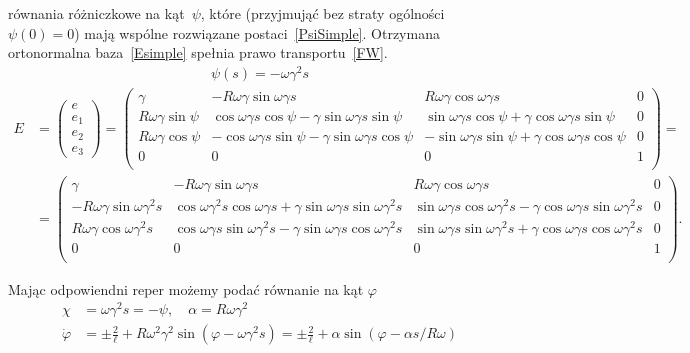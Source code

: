 równania  różniczkowe na kąt~$\psi$, które 
(przyjmująć bez straty ogólności
$\psi(0)=0$) mają wspólne rozwiązane postaci~\eqref{PsiSimple}.
Otrzymana ortonormalna baza~\eqref{Esimple} spełnia 
prawo transportu~\eqref{FW}.
\begin{align}\label{PsiSimple}
\psi (s) = -\omega \gamma^2 s
\end{align}
\begin{align}\label{Esimple}
E&=
\begin{pmatrix}
e\\
e_1\\
e_2\\
e_3
\end{pmatrix}
=
\begin{pmatrix}
\gamma  & -R\omega\gamma \sin \omega \gamma s 
& R\omega\gamma \cos\omega\gamma s         & 0 \\
R\omega\gamma \sin \psi  
&  \cos\omega\gamma s \cos\psi 
-\gamma \sin \omega\gamma s \sin\psi &  
\sin\omega\gamma s \cos\psi
+\gamma \cos\omega\gamma s\sin \psi & 0 \\
R\omega\gamma \cos\psi      &  
-\cos\omega\gamma s \sin\psi 
- \gamma \sin\omega\gamma s \cos\psi   &  
-\sin\omega\gamma s \sin\psi 
+ \gamma \cos\omega\gamma s \cos\psi & 0 \\
0 & 0 & 0 & 1 \\
\end{pmatrix} 
=
\\
&=\nonumber
\begin{pmatrix} 
\gamma  & -R\omega\gamma \sin \omega \gamma s 
& R\omega\gamma \cos\omega\gamma s         & 0 \\
-R\omega\gamma \sin\omega\gamma^2 s  
&  \cos\omega\gamma^2 s\cos\omega\gamma s + 
\gamma \sin \omega\gamma s \sin\omega\gamma^2 s &  
\sin\omega\gamma s \cos\omega\gamma^2 s 
- \gamma \cos\omega\gamma s\sin \omega\gamma^2 s & 0 \\
R\omega\gamma \cos\omega\gamma^2 s       &  
\cos\omega\gamma s \sin\omega\gamma^2 s 
- \gamma \sin\omega\gamma s \cos\omega\gamma^2 s   &  
\sin\omega\gamma s \sin\omega\gamma^2 s 
+ \gamma \cos\omega\gamma s \cos\omega\gamma^2 s & 0 \\
0 & 0 & 0 & 1 \\
\end{pmatrix}.
\end{align}

Mając odpowiendni reper możemy podać równanie na kąt $\varphi$
\begin{align*}\nonumber
\chi &= \omega \gamma^2 s = - \psi, \quad \alpha = R \omega \gamma^2 \\
\dot{\varphi} &= \pm \frac{2}{\ell} + \label{phiSimple}
R \omega^2 \gamma^2\sin (\varphi - \omega\gamma^2 s )
= \pm \frac{2}{\ell} +\alpha \sin (\varphi - \alpha s / R\omega ) 
\end{align*}


